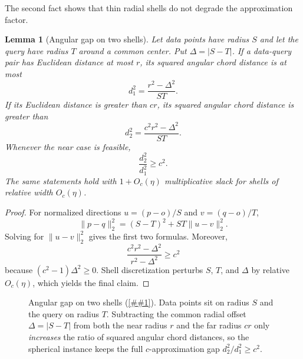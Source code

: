 \documentclass[10pt]{article}
\newcommand{\cref}[1]{\ref{##1}}
\newtheorem{lemma}[theorem]{Lemma}
\theoremstyle{definition}
\begin{document}
The second fact shows that thin radial shells do not degrade the approximation factor.

\begin{lemma}[Angular gap on two shells]\label{lem:shell}
   Let data points have radius $S$ and let the query have radius $T$ around a common center. Put $\Delta=|S-T|$. If a data-query pair has Euclidean distance at most $r$, its squared angular chord distance is at most
   \[
      d_1^2=\frac{r^2-\Delta^2}{ST}.
   \]
   If its Euclidean distance is greater than $cr$, its squared angular chord distance is greater than
   \[
      d_2^2=\frac{c^2r^2-\Delta^2}{ST}.
   \]
   Whenever the near case is feasible,
   \[
      \frac{d_2^2}{d_1^2}\ge c^2.
   \]
   The same statements hold with $1+O_c(\eta)$ multiplicative slack for shells of relative width $O_c(\eta)$.
\end{lemma}

\begin{proof}
   For normalized directions $u=(p-o)/S$ and $v=(q-o)/T$,
   \[
      \|p-q\|_2^2=(S-T)^2+ST\|u-v\|_2^2.
   \]
   Solving for $\|u-v\|_2^2$ gives the first two formulas. Moreover,
   \[
      \frac{c^2r^2-\Delta^2}{r^2-\Delta^2}
      \ge c^2
   \]
   because $(c^2-1)\Delta^2\ge0$. Shell discretization perturbs $S$, $T$, and $\Delta$ by relative $O_c(\eta)$, which yields the final claim.
\end{proof}

\begin{figure}[t]\centering
{}
\caption{Angular gap on two shells (\cref{lem:shell}). Data points sit on radius $S$ and the query on radius $T$. Subtracting the common radial offset $\Delta=|S-T|$ from both the near radius $r$ and the far radius $cr$ only \emph{increases} the ratio of squared angular chord distances, so the spherical instance keeps the full $c$-approximation gap $d_2^2/d_1^2\ge c^2$.}
\label{fig:shell}
\end{figure}
\end{document}
